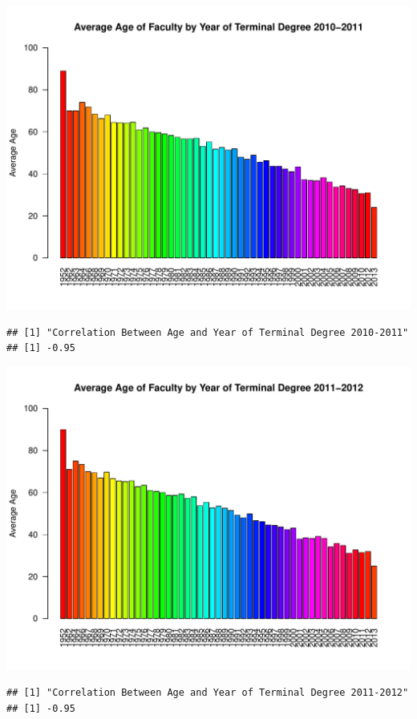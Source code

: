 \documentclass[12pt,a4paper]{article}\usepackage[]{graphicx}\usepackage[]{color}
\makeatletter
\def\maxwidth{ %
  \ifdim\Gin@nat@width>\linewidth
    \linewidth
  \else
    \Gin@nat@width
  \fi
}
\newenvironment{kframe}{%
 \def\at@end@of@kframe{}%
 \ifinner\ifhmode%
  \def\at@end@of@kframe{\end{minipage}}%
  \begin{minipage}{\columnwidth}%
 \fi\fi%
 \def\FrameCommand##1{\hskip\@totalleftmargin \hskip-\fboxsep
 \colorbox{shadecolor}{##1}\hskip-\fboxsep
     \hskip-\linewidth \hskip-\@totalleftmargin \hskip\columnwidth}%
 \MakeFramed {\advance\hsize-\width
   \@totalleftmargin\z@ \linewidth\hsize
   \@setminipage}}%
 {\par\unskip\endMakeFramed%
 \at@end@of@kframe}
\newenvironment{knitrout}{}{} %
\theoremstyle{definition}
\makeatother
\begin{document}
\begin{knitrout}
\includegraphics[width=\maxwidth]{figure/unnamed-chunk-11-7} 
\begin{kframe}\begin{verbatim}
## [1] "Correlation Between Age and Year of Terminal Degree 2010-2011"
## [1] -0.95
\end{verbatim}
\end{kframe}
\includegraphics[width=\maxwidth]{figure/unnamed-chunk-11-8} 
\begin{kframe}\begin{verbatim}
## [1] "Correlation Between Age and Year of Terminal Degree 2011-2012"
## [1] -0.95
\end{verbatim}
\end{kframe}

\end{knitrout}
\end{document}
